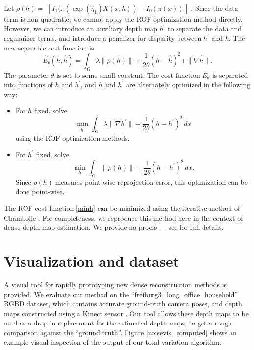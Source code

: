 \documentclass[conference]{IEEEtran}
\begin{document}
Let $\rho(h) = \left\|I_1(\pi(\exp(\hat{\eta}_1)X(x,h)) - I_0(\pi(x))\right\|$. Since the data term is non-quadratic, we
cannot apply the ROF optimization method directly. However, we can introduce
an auxiliary depth map $h^\prime$ to separate the data and regularizer terms,
and introduce a penalizer for disparity between $h^\prime$ and $h$. The
new separable cost function is
\begin{equation}\label{separable_cost}
    \hat{E}_\theta(h, \hat{h}) = \int_\Omega \lambda \|\rho(h)\| + \frac{1}{2\theta}(h - \hat{h})^2 + \|\nabla \hat{h}\|.
\end{equation}
The parameter $\theta$ is set to some small constant.
The cost function $E_\theta$ is separated into functions of $h$ and $h^\prime$,
and $h$ and $h^\prime$ are alternately optimized in the following way:
\begin{itemize}
    \item For $h$ fixed, solve
        \begin{equation}\label{minh}
            \min_{h^\prime} \int_\Omega \lambda \|\nabla h^\prime\| + \frac{1}{2\theta}(h - h^\prime)^2\,dx
        \end{equation}
    using the ROF optimization methods.
    \item For $h^\prime$ fixed, solve
        \begin{equation}\label{minhhat}
            \min_h \int_\Omega \|\rho(h)\| + \frac{1}{2\theta}(h - h^\prime)^2\,dx.
        \end{equation}
        Since $\rho(h)$ measures point-wise reprojection error, this
        optimization can be done point-wise.
\end{itemize}
The ROF cost function \eqref{minh} can be minimized using the iterative method of Chambolle \cite{chambolle}. For completeness, we reproduce this
method here in the context of dense depth map estimation. We provide no proofs --- see \cite{chambolle} for full details.




\section{Visualization and dataset}
A visual tool for rapidly prototyping new dense reconstruction methods is provided.
We evaluate our method on the ``freiburg3\_long\_office\_household'' RGBD dataset, which contains accurate ground-truth camera poses, and
depth maps constructed using a Kinect sensor \cite{dataset} \cite{largescale}. Our tool allows these depth maps to be used as a drop-in replacement for the estimated
depth maps, to get a rough comparison against the ``ground truth''. Figure \ref{noisevis_computed} shows an example visual inspection of the output
of our total-variation algorithm.
\end{document}
